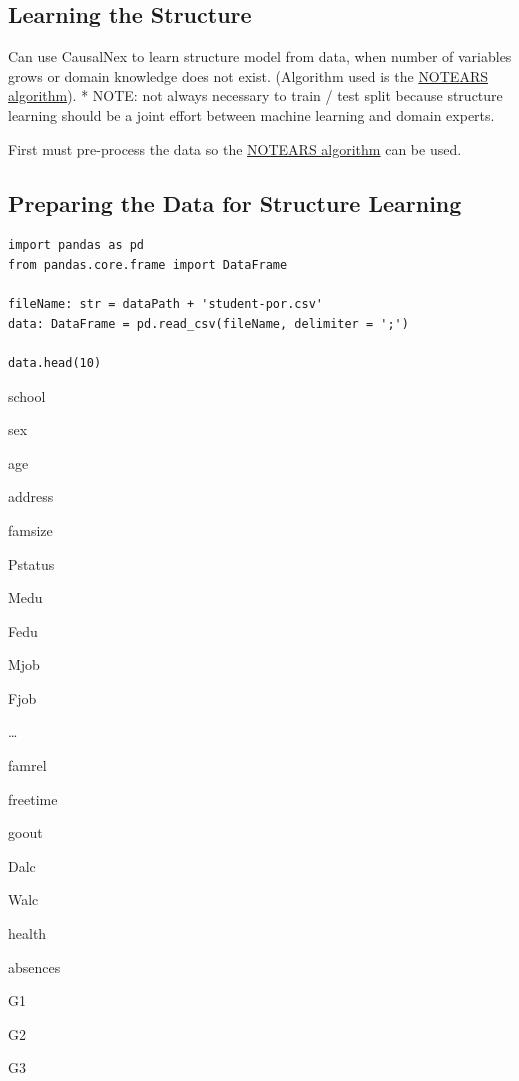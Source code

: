 \documentclass[
]{article}
\begin{document}
\hypertarget{learning-the-structure}{%
\subsection{Learning the Structure}\label{learning-the-structure}}

Can use CausalNex to learn structure model from data, when number of
variables grows or domain knowledge does not exist. (Algorithm used is
the \href{https://arxiv.org/abs/1803.01422}{NOTEARS algorithm}). * NOTE:
not always necessary to train / test split because structure learning
should be a joint effort between machine learning and domain experts.

First must pre-process the data so the
\href{https://arxiv.org/abs/1803.01422}{NOTEARS algorithm} can be used.

\hypertarget{preparing-the-data-for-structure-learning}{%
\subsection{Preparing the Data for Structure
Learning}\label{preparing-the-data-for-structure-learning}}

\begin{verbatim}
import pandas as pd
from pandas.core.frame import DataFrame

fileName: str = dataPath + 'student-por.csv'
data: DataFrame = pd.read_csv(fileName, delimiter = ';')

data.head(10)
\end{verbatim}

school

sex

age

address

famsize

Pstatus

Medu

Fedu

Mjob

Fjob

\ldots{}

famrel

freetime

goout

Dalc

Walc

health

absences

G1

G2

G3
\end{document}
